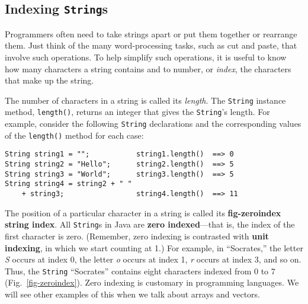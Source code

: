 \subsection{Indexing {\tt String}s }

\noindent Programmers often need to take strings apart or put them
together or rearrange them. Just think of the many word-processing
tasks, such as cut and paste, that involve such operations.  To help
simplify such operations, it is useful to know how many characters a
string contains and to number, or {\em index}, the characters that
make up the string.

The number of characters in a string is called its {\it length}.  The
{\tt String} instance method, {\tt length()}, returns an integer that
gives the {\tt String}'s length.  For example, consider the following
{\tt String} declarations and the corresponding values of the
{\tt length()} method for each case:

\begin{jjjlisting}
\begin{lstlisting}
String string1 = "";           string1.length()  ==> 0
String string2 = "Hello";      string2.length()  ==> 5
String string3 = "World";      string3.length()  ==> 5
String string4 = string2 + " " 
    + string3;                 string4.length()  ==> 11
\end{lstlisting}
\end{jjjlisting}

The position of a particular character in a string is called its {\bf
{}
{fig-zeroindex}
string index}. All {\tt String}s in Java are {\bf zero
indexed}---that is, the index of the first
character is zero.  (Remember, zero indexing is contrasted with {\bf
unit indexing}, in which we start counting at 1.)  For example, in
``Socrates,'' the letter {\it S} occurs at index 0, the letter {\it o}
occurs at index 1, {\it r} occurs at index 3, and so on.  Thus, the
{\tt String} ``Socrates'' contains eight characters indexed from 0 to
7 (Fig.~\ref{fig-zeroindex}).  Zero indexing is customary in programming
languages.  We will see other examples of this when we talk about
arrays and vectors.


